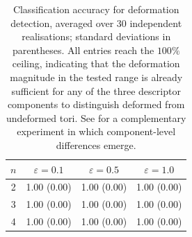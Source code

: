 \begin{table}[htbp]\centering
\caption{Classification accuracy for deformation detection, averaged over 30
independent realisations; standard deviations in parentheses. All entries
reach the \(100\%\) ceiling, indicating that the deformation magnitude in the
tested range is already sufficient for any of the three descriptor components
to distinguish deformed from undeformed tori. See  for a
complementary experiment in which component-level differences emerge.}
\label{tab:classification}
\begin{tabular}{cccc}\hline
\(n\) & \(\varepsilon = 0.1\) & \(\varepsilon = 0.5\) & \(\varepsilon = 1.0\) \\\hline
2 & 1.00 (0.00) & 1.00 (0.00) & 1.00 (0.00) \\
3 & 1.00 (0.00) & 1.00 (0.00) & 1.00 (0.00) \\
4 & 1.00 (0.00) & 1.00 (0.00) & 1.00 (0.00) \\
\hline\end{tabular}\end{table}